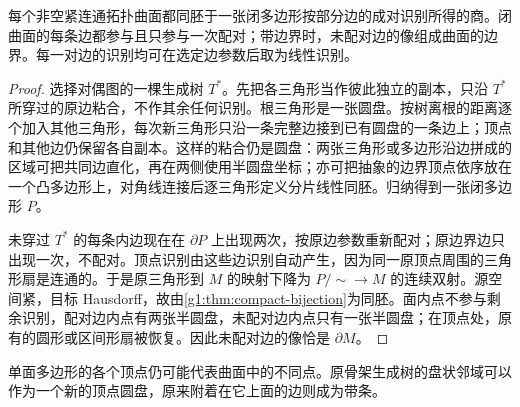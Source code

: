 \begin{theorem}\label{g1:thm:surface-polygon}
	每个非空紧连通拓扑曲面都同胚于一张闭多边形按部分边的成对识别所得的商。闭曲面的每条边都参与且只参与一次配对；带边界时，未配对边的像组成曲面的边界。每一对边的识别均可在选定边参数后取为线性识别。
\end{theorem}
\begin{proof}
	选择对偶图的一棵生成树 \(T^*\)。先把各三角形当作彼此独立的副本，只沿 \(T^*\) 所穿过的原边粘合，不作其余任何识别。根三角形是一张圆盘。按树离根的距离逐个加入其他三角形，每次新三角形只沿一条完整边接到已有圆盘的一条边上；顶点和其他边仍保留各自副本。这样的粘合仍是圆盘：两张三角形或多边形沿边拼成的区域可把共同边直化，再在两侧使用半圆盘坐标；亦可把抽象的边界顶点依序放在一个凸多边形上，对角线连接后逐三角形定义分片线性同胚。归纳得到一张闭多边形 \(P\)。

	未穿过 \(T^*\) 的每条内边现在在 \(\partial P\) 上出现两次，按原边参数重新配对；原边界边只出现一次，不配对。顶点识别由这些边识别自动产生，因为同一原顶点周围的三角形扇是连通的。于是原三角形到 \(M\) 的映射下降为 \(P/{\sim}\to M\) 的连续双射。源空间紧，目标 Hausdorff，故由\cref{g1:thm:compact-bijection}为同胚。面内点不参与剩余识别，配对边内点有两张半圆盘，未配对边内点只有一张半圆盘；在顶点处，原有的圆形或区间形扇被恢复。因此未配对边的像恰是 \(\partial M\)。
\end{proof}

单面多边形的各个顶点仍可能代表曲面中的不同点。原骨架生成树的盘状邻域可以作为一个新的顶点圆盘，原来附着在它上面的边则成为带条。

